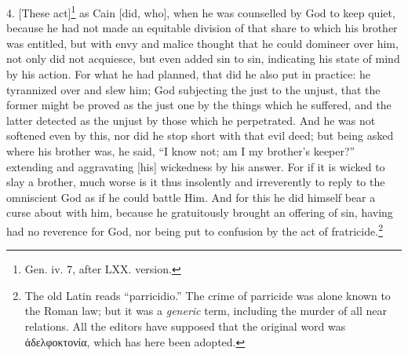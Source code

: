 4.  [These act]\footnote{Gen. iv. 7, after LXX. version.} as Cain [did, who], when he was counselled by God to keep quiet, because he had not made an equitable division of that share to which his brother was entitled, but with envy and malice thought that he could domineer over him, not only did not acquiesce, but even added sin to sin, indicating his state of mind by his action. For what he had planned, that did he also put in practice: he tyrannized over and slew him; God subjecting the just to the unjust, that the former might be proved as the just one by the things which he suffered, and the latter detected as the unjust by those which he perpetrated. And he was not softened even by this, nor did he stop short with that evil deed; but being asked where his brother was, he said, “I know not; am I my brother’s keeper?” extending and aggravating [his] wickedness by his answer. For if it is wicked to slay a brother, much worse is it thus insolently and irreverently to reply to the omniscient God as if he could battle Him. And for this he did himself bear a curse about with him, because he gratuitously brought  an offering of sin, having had no reverence for God, nor being put to confusion by the act of fratricide.\footnote{The old Latin reads “parricidio.” The crime of parricide was alone known to the Roman law; but it was a \emph{generic} term, including the murder of all near relations. All the editors have supposed that the original word was \textgreek{ἀδελφοκτονία,} which has here been adopted.}

